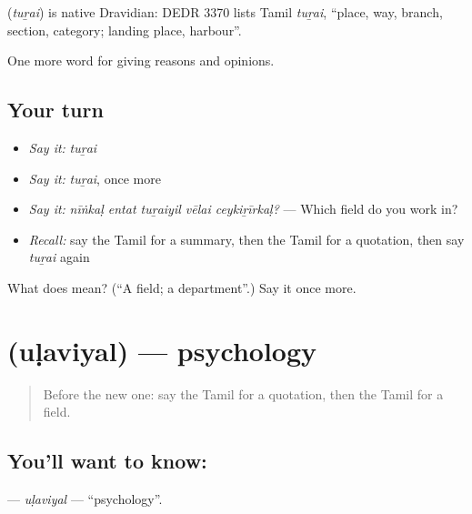 \begin{cousinweb}
\textbf{} (\emph{tuṟai}) is native Dravidian: DEDR 3370 lists Tamil \emph{tuṟai}, \textquotedblleft{}place, way, branch, section, category; landing place, harbour\textquotedblright{}.
\end{cousinweb}

\begin{grammarlens}[title={What you've built}]
One more word for giving reasons and opinions.
\end{grammarlens}

\subsection*{Your turn}
\begin{itemize}
\raggedright
  \item \emph{Say it:} \emph{tuṟai}
  \item \emph{Say it:} \emph{tuṟai}, once more
  \item \emph{Say it:} \emph{nīṅkaḷ entat tuṟaiyil vēlai ceykiṟīrkaḷ?} — Which field do you work in?
  \item \emph{Recall:} say the Tamil for a summary, then the Tamil for a quotation, then say \emph{tuṟai} again
\end{itemize}

\begin{tcolorbox}[breakable,colback=teal!4,colframe=teal!35!black,title={Before you move on}]
What does  mean? (\textquotedblleft{}A field; a department\textquotedblright{}.) Say it once more.
\end{tcolorbox}
\section[\texorpdfstring{\ta{உளவியல்} (uḷaviyal)}{உளவியல் (uḷaviyal)}]{ (uḷaviyal) — psychology}

\label{lesson:TA-C366-ulaviyal}



\begin{quote}
Before the new one: say the Tamil for a quotation, then the Tamil for a field.
\end{quote}

\subsection*{You'll want to know: }
\textbf{} — \emph{uḷaviyal} — \textquotedblleft{}psychology\textquotedblright{}.

